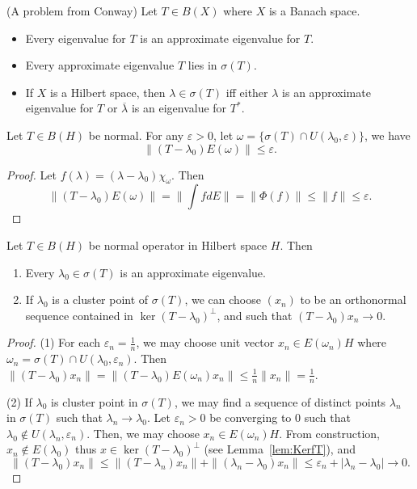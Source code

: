 \begin{proposition} (A problem from Conway)
	\label{prop:ApproxEigen}
	Let $T \in B(X)$ where $X$ is a Banach space.
	\begin{itemize}
		\item Every eigenvalue for $T$ is an approximate eigenvalue for $T$.
		\item Every approximate eigenvalue $T$ lies in $\sigma(T)$.
		\item If $X$ is a Hilbert space, then $\lambda \in \sigma(T)$ iff either $\lambda$ is an approximate eigenvalue for $T$ or $\overline{\lambda} $ is an eigenvalue for $T^*$.
	\end{itemize}
\end{proposition}

\begin{lemma}
	\label{lem:Eepsilon}
	Let $T \in B(H)$ be normal.
	For any $\varepsilon>0$, let $\omega = \{\sigma(T) \cap U(\lambda_0, \varepsilon)\}$, we have
			\[
				\|(T - \lambda_0) E\left( \omega  \right) \| \le  \varepsilon
			.\] 
\end{lemma}
\begin{proof}
	Let $f(\lambda) = (\lambda - \lambda_0)\chi_\omega$. Then
	\[
		\|(T - \lambda_0) E(\omega)\|
		= \|\int f d E\|
		= \|\Phi(f)\|
		\le \|f\|
		\le \varepsilon
	.\] 
\end{proof}


\begin{proposition}
	\label{prop:ApproxEigenNormal}
	Let $T \in B(H)$ be normal operator in Hilbert space $H$. Then
	\begin{enumerate}
		\item Every $\lambda_0 \in \sigma(T)$ is an approximate eigenvalue.
		\item If $\lambda_0$ is a cluster point of $\sigma(T)$, we can choose $(x_n)$ to be an orthonormal sequence contained in $\operatorname{ker} (T - \lambda_0)^\perp$, and such that $(T - \lambda_0) x_n \to 0$.

	\end{enumerate}
\end{proposition}
\begin{proof}
	(1) For each $\varepsilon_n = \frac{1}{n}$, we may choose unit vector $x_n \in E(\omega_n) H$ where $\omega_n = \sigma(T) \cap U(\lambda_0, \varepsilon_n)$. Then $\|(T - \lambda_0) x_n\| = \|(T - \lambda_0) E(\omega_n) x_n\| \le \frac{1}{n} \|x_n\| = \frac{1}{n}$.
	
	(2) If $\lambda_0$ is cluster point in $\sigma(T)$, we may find a sequence of distinct points $\lambda_n$ in $\sigma(T)$ such that $\lambda_n \to \lambda_0$. Let $\varepsilon_n >0$ be converging to $0$ such that $\lambda_0 \not\in U(\lambda_n, \varepsilon_n)$. Then, we may choose $x_n \in E(\omega_n) H$. From construction, $x_n \not\in E(\lambda_0)$ thus $x \in \operatorname{ker} \left( T - \lambda_0 \right) ^\perp $ (see Lemma~\ref{lem:KerfT}), and
	\[
		\|(T - \lambda_0) x_n\| \le \|(T - \lambda_n) x_n\| + \|(\lambda_n - \lambda_0) x_n\| \le  \varepsilon_n + |\lambda_n - \lambda_0| \to 0
	.\] 
\end{proof}

